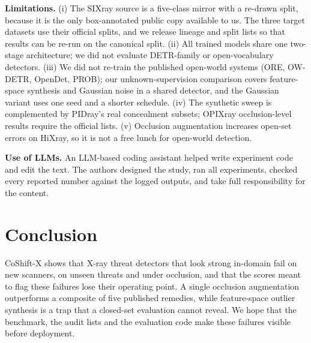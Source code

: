 \documentclass[10pt,twocolumn,letterpaper]{article}
\begin{document}
\textbf{Limitations.} (i) The SIXray source is a five-class mirror with a re-drawn split, because it is the only box-annotated public copy available to us. The three target datasets use their official splits, and we release lineage and split lists so that results can be re-run on the canonical split. (ii) All trained models share one two-stage architecture; we did not evaluate DETR-family or open-vocabulary detectors. (iii) We did not re-train the published open-world systems (ORE, OW-DETR, OpenDet, PROB); our unknown-supervision comparison covers feature-space synthesis and Gaussian noise in a shared detector, and the Gaussian variant uses one seed and a shorter schedule. (iv) The synthetic sweep is complemented by PIDray's real concealment subsets; OPIXray occlusion-level results require the official lists. (v) Occlusion augmentation increases open-set errors on HiXray, so it is not a free lunch for open-world detection.

\textbf{Use of LLMs.} An LLM-based coding assistant helped write experiment code and edit the text. The authors designed the study, ran all experiments, checked every reported number against the logged outputs, and take full responsibility for the content.

\section{Conclusion}
CoShift-X shows that X-ray threat detectors that look strong in-domain fail on new scanners, on unseen threats and under occlusion, and that the scores meant to flag these failures lose their operating point. A single occlusion augmentation outperforms a composite of five published remedies, while feature-space outlier synthesis is a trap that a closed-set evaluation cannot reveal. We hope that the benchmark, the audit lists and the evaluation code make these failures visible before deployment.

{\small


}
\end{document}
